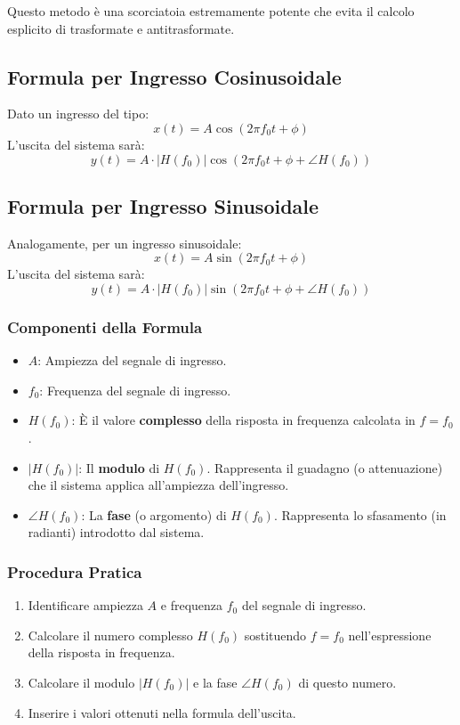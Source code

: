 Questo metodo è una scorciatoia estremamente potente che evita il calcolo esplicito di trasformate e antitrasformate.

\subsection{Formula per Ingresso Cosinusoidale}
Dato un ingresso del tipo:
\begin{equation*}
    x(t) = A \cos(2\pi f_0 t + \phi)
\end{equation*}
L'uscita del sistema sarà:
\begin{equation*}
    y(t) = A \cdot |H(f_0)| \cos(2\pi f_0 t + \phi + \angle H(f_0))
\end{equation*}

\subsection{Formula per Ingresso Sinusoidale}
Analogamente, per un ingresso sinusoidale:
\begin{equation*}
    x(t) = A \sin(2\pi f_0 t + \phi)
\end{equation*}
L'uscita del sistema sarà:
\begin{equation*}
    y(t) = A \cdot |H(f_0)| \sin(2\pi f_0 t + \phi + \angle H(f_0))
\end{equation*}

\subsubsection{Componenti della Formula}
\begin{itemize}
    \item \textbf{$A$}: Ampiezza del segnale di ingresso.
    \item \textbf{$f_0$}: Frequenza del segnale di ingresso.
    \item \textbf{$H(f_0)$}: È il valore \textbf{complesso} della risposta in frequenza calcolata in $f=f_0$.
    \item \textbf{$|H(f_0)|$}: Il \textbf{modulo} di $H(f_0)$. Rappresenta il guadagno (o attenuazione) che il sistema applica all'ampiezza dell'ingresso.
    \item \textbf{$\angle H(f_0)$}: La \textbf{fase} (o argomento) di $H(f_0)$. Rappresenta lo sfasamento (in radianti) introdotto dal sistema.
\end{itemize}

\subsubsection{Procedura Pratica}
\begin{enumerate}
    \item Identificare ampiezza $A$ e frequenza $f_0$ del segnale di ingresso.
    \item Calcolare il numero complesso $H(f_0)$ sostituendo $f=f_0$ nell'espressione della risposta in frequenza.
    \item Calcolare il modulo $|H(f_0)|$ e la fase $\angle H(f_0)$ di questo numero.
    \item Inserire i valori ottenuti nella formula dell'uscita.
\end{enumerate}